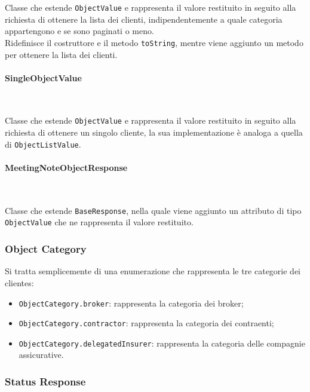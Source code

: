 \noindent Classe che estende \lstinline{ObjectValue} e rappresenta il valore restituito in seguito alla richiesta di ottenere la lista dei clienti, indipendentemente a quale categoria appartengono e se sono paginati o meno.\\
Ridefinisce il costruttore e il metodo \lstinline{toString}, mentre viene aggiunto un metodo per ottenere la lista dei clienti.

\paragraph*{SingleObjectValue} ~ \\
\label{par:single-object-value}

\noindent Classe che estende \lstinline{ObjectValue} e rappresenta il valore restituito in seguito alla richiesta di ottenere un singolo cliente, la sua implementazione è analoga a quella di \lstinline{ObjectListValue}.

\paragraph*{MeetingNoteObjectResponse} ~ \\
\label{par:meeting-note-object-response}

\noindent Classe che estende \lstinline{BaseResponse}, nella quale viene aggiunto un attributo di tipo \lstinline{ObjectValue} che ne rappresenta il valore restituito.

\subsubsection*{Object Category}
\label{subsubsec:object-category}

Si tratta semplicemente di una enumerazione che rappresenta le tre categorie dei \glspl{cliente}\glsoccur:
\begin{itemize}
    \item \lstinline{ObjectCategory.broker}: rappresenta la categoria dei broker;
    \item \lstinline{ObjectCategory.contractor}: rappresenta la categoria dei contraenti;
    \item \lstinline{ObjectCategory.delegatedInsurer}: rappresenta la categoria delle compagnie assicurative.
\end{itemize}

\subsubsection*{Status Response}
\label{subsubsec:status-response}

